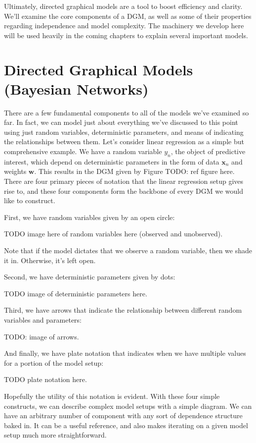 Ultimately, directed graphical models are a tool to boost efficiency and clarity. We'll examine the core components of a DGM, as well as some of their properties regarding independence and model complexity. The machinery we develop here will be used heavily in the coming chapters to explain several important models.

\section{Directed Graphical Models (Bayesian Networks)}
There are a few fundamental components to all of the models we've examined so far. In fact, we can model just about everything we've discussed to this point using just random variables, deterministic parameters, and means of indicating the relationships between them. Let's consider linear regression as a simple but comprehensive example. We have a random variable $y_n$, the object of predictive interest, which depend on deterministic parameters in the form of data $\textbf{x}_n$ and weights $\textbf{w}$. This results in the DGM given by Figure TODO: ref figure here. There are four primary pieces of notation that the linear regression setup gives rise to, and these four components form the backbone of every DGM we would like to construct.

First, we have random variables given by an open circle:

TODO image here of random variables here (observed and unobserved).

Note that if the model dictates that we observe a random variable, then we shade it in. Otherwise, it's left open.

Second, we have deterministic parameters given by dots:

TODO image of deterministic parameters here.

Third, we have arrows that indicate the relationship between different random variables and parameters:

TODO: image of arrows.

And finally, we have plate notation that indicates when we have multiple values for a portion of the model setup:

TODO plate notation here.

Hopefully the utility of this notation is evident. With these four simple constructs, we can describe complex model setups with a simple diagram. We can have an arbitrary number of component with any sort of dependence structure baked in. It can be a useful reference, and also makes iterating on a given model setup much more straightforward.

